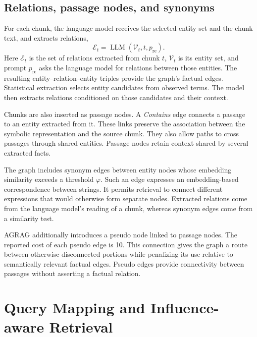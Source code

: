 \subsection{Relations, passage nodes, and synonyms}
For each chunk, the language model receives the selected entity set and the chunk text, and extracts relations,
\begin{equation}
\mathcal{E}_t=\operatorname{LLM}(\mathcal{V}_t,t,p_{\mathrm{re}}).
\label{eq:agrag:relations}
\end{equation}
Here $\mathcal E_t$ is the set of relations extracted from chunk $t$, $\mathcal V_t$ is its entity set, and prompt $p_{\mathrm{re}}$ asks the language model for relations between those entities. The resulting entity--relation--entity triples provide the graph's factual edges. Statistical extraction selects entity candidates from observed terms. The model then extracts relations conditioned on those candidates and their context.

Chunks are also inserted as passage nodes. A \textit{Contains} edge connects a passage to an entity extracted from it. These links preserve the association between the symbolic representation and the source chunk. They also allow paths to cross passages through shared entities. Passage nodes retain context shared by several extracted facts.

The graph includes synonym edges between entity nodes whose embedding similarity exceeds a threshold $\varphi$. Such an edge expresses an embedding-based correspondence between strings. It permits retrieval to connect different expressions that would otherwise form separate nodes. Extracted relations come from the language model's reading of a chunk, whereas synonym edges come from a similarity test.

AGRAG additionally introduces a pseudo node linked to passage nodes. The reported cost of each pseudo edge is 10. This connection gives the graph a route between otherwise disconnected portions while penalizing its use relative to semantically relevant factual edges. Pseudo edges provide connectivity between passages without asserting a factual relation.

\section{Query Mapping and Influence-aware Retrieval}
\label{sec:agrag:influence}
